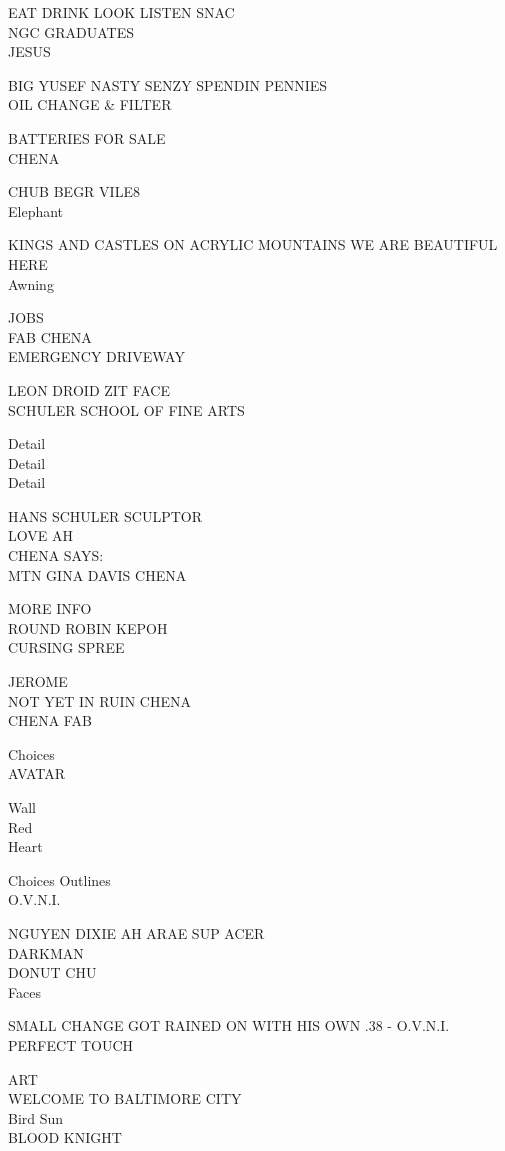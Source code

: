 \documentclass[10pt,letterpaper]{article}
\begin{document}
EAT DRINK LOOK LISTEN SNAC\\
NGC GRADUATES\\
JESUS

BIG YUSEF NASTY SENZY SPENDIN PENNIES\\
OIL CHANGE \& FILTER

BATTERIES FOR SALE\\
CHENA

CHUB BEGR VILE8\\
Elephant

KINGS AND CASTLES ON ACRYLIC MOUNTAINS WE ARE BEAUTIFUL HERE\\
Awning

JOBS\\
FAB CHENA\\
EMERGENCY DRIVEWAY

LEON DROID ZIT FACE\\
SCHULER SCHOOL OF FINE ARTS

Detail\\
Detail\\
Detail

HANS SCHULER SCULPTOR\\
LOVE AH\\
CHENA SAYS:\\
MTN GINA DAVIS CHENA

MORE INFO\\
ROUND ROBIN KEPOH\\
CURSING SPREE

JEROME\\
NOT YET IN RUIN CHENA\\
CHENA FAB

Choices\\
AVATAR

Wall\\
Red\\
Heart

Choices Outlines\\
O.V.N.I.

NGUYEN DIXIE AH ARAE SUP ACER\\
DARKMAN\\
DONUT CHU\\
Faces

SMALL CHANGE GOT RAINED ON WITH HIS OWN .38 {-} O.V.N.I.\\
PERFECT TOUCH

ART\\
WELCOME TO BALTIMORE CITY\\
Bird Sun\\
BLOOD KNIGHT
\end{document}
